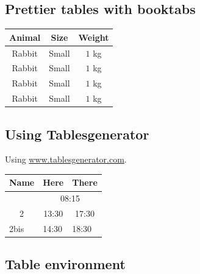 \documentclass[10pt,a4paper]{article}
\begin{document}
\subsection{Prettier tables with booktabs}


\begin{tabular}{ccc}
\toprule
\textbf{Animal} & \textbf{Size} & \textbf{Weight} \\ 
\midrule
Rabbit & Small & $1$ kg \\ 
Rabbit & Small & $1$ kg \\ 
Rabbit & Small & $1$ kg \\ 
Rabbit & Small & $1$ kg \\ 
\bottomrule
\end{tabular}

\subsection{Using Tablesgenerator}

Using \url{www.tablesgenerator.com}.

\begin{tabular}{@{}ccc@{}}
\toprule
\cellcolor[HTML]{6665CD}Name                    & \cellcolor[HTML]{6665CD}Here & There                      \\ \midrule
\rowcolor[HTML]{6665CD} 
\multicolumn{1}{|c|}{\cellcolor[HTML]{6665CD}1} & \multicolumn{2}{c|}{\cellcolor[HTML]{6665CD}08:15}        \\ \midrule
\multicolumn{1}{|c|}{2}                         & \multicolumn{1}{c|}{13:30}   & \multicolumn{1}{c|}{17:30} \\ \midrule
\multicolumn{1}{l}{2bis}                        & \multicolumn{1}{l}{14:30}    & \multicolumn{1}{l}{18:30}  \\ \bottomrule
\end{tabular}

\subsection{Table environment}
\end{document}
